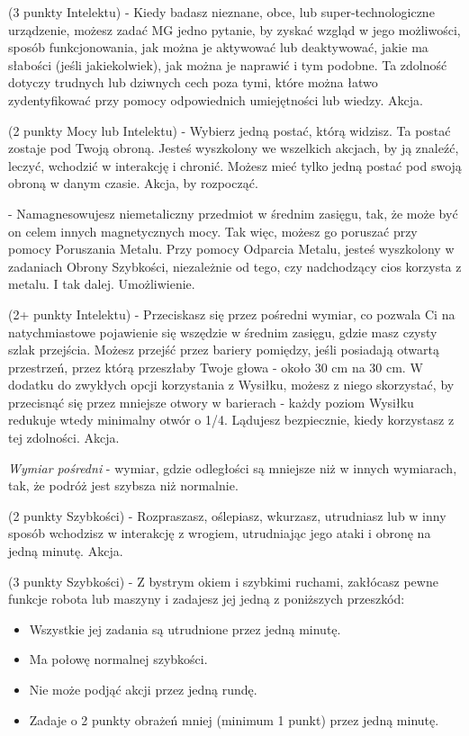 { (3 punkty Intelektu) - Kiedy badasz nieznane, obce, lub super-technologiczne urządzenie, możesz zadać MG jedno pytanie, by zyskać wzgląd w jego możliwości, sposób funkcjonowania, jak można je aktywować lub deaktywować, jakie ma słabości (jeśli jakiekolwiek), jak można je naprawić i tym podobne. Ta zdolność dotyczy trudnych lub dziwnych cech poza tymi, które można łatwo zydentyfikować przy pomocy odpowiednich umiejętności lub wiedzy. Akcja.

 (2 punkty Mocy lub Intelektu) - Wybierz jedną postać, którą widzisz. Ta postać zostaje pod Twoją obroną. Jesteś wyszkolony we wszelkich akcjach, by ją znaleźć, leczyć, wchodzić w interakcję i chronić. Możesz mieć tylko jedną postać pod swoją obroną w danym czasie. Akcja, by rozpocząć.

 - Namagnesowujesz niemetaliczny przedmiot w średnim zasięgu, tak, że może być on celem innych magnetycznych mocy. Tak więc, możesz go poruszać przy pomocy Poruszania Metalu. Przy pomocy Odparcia Metalu, jesteś wyszkolony w zadaniach Obrony Szybkości, niezależnie od tego, czy nadchodzący cios korzysta z metalu. I tak dalej. Umożliwienie.

 (2+ punkty Intelektu) - Przeciskasz się przez pośredni wymiar, co pozwala Ci na natychmiastowe pojawienie się wszędzie w średnim zasięgu, gdzie masz czysty szlak przejścia. Możesz przejść przez bariery pomiędzy, jeśli posiadają otwartą przestrzeń, przez którą przeszłaby Twoje głowa - około 30 cm na 30 cm. W dodatku do zwykłych opcji korzystania z Wysiłku, możesz z niego skorzystać, by przecisnąć się przez mniejsze otwory w barierach - każdy poziom Wysiłku redukuje wtedy minimalny otwór o 1/4. Lądujesz bezpiecznie, kiedy korzystasz z tej zdolności. Akcja. 

\textit{Wymiar pośredni} - wymiar, gdzie odległości są mniejsze niż w innych wymiarach, tak, że podróż jest szybsza niż normalnie.

 (2 punkty Szybkości) - Rozpraszasz, oślepiasz, wkurzasz, utrudniasz lub w inny sposób wchodzisz w interakcję z wrogiem, utrudniając jego ataki i obronę na jedną minutę. Akcja.

 (3 punkty Szybkości) - Z bystrym okiem i szybkimi ruchami, zakłócasz pewne funkcje robota lub maszyny i zadajesz jej jedną z poniższych przeszkód:
\begin{itemize}
\item Wszystkie jej zadania są utrudnione przez jedną minutę.
\item Ma połowę normalnej szybkości.
\item Nie może podjąć akcji przez jedną rundę.
\item Zadaje o 2 punkty  obrażeń mniej (minimum 1 punkt) przez jedną minutę. 
\end{itemize}

}
